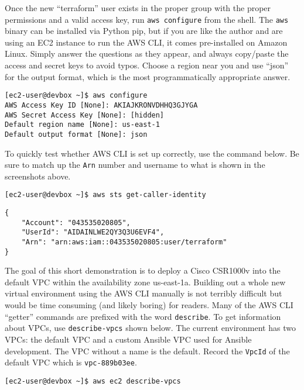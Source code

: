 Once the new ``terraform'' user exists in the proper group with the proper
permissions and a valid access key, run \verb|aws configure| from the shell. The
\verb|aws| binary can be installed via Python pip, but if you are like the author
and are using an EC2 instance to run the AWS CLI, it comes pre-installed on
Amazon Linux. Simply answer the questions as they appear, and always
copy/paste the access and secret keys to avoid typos. Choose a region near you
and use ``json'' for the output format, which is the most programmatically
appropriate answer.

\begin{verbatim}
[ec2-user@devbox ~]$ aws configure
AWS Access Key ID [None]: AKIAJKRONVDHHQ3GJYGA
AWS Secret Access Key [None]: [hidden]
Default region name [None]: us-east-1
Default output format [None]: json
\end{verbatim}

To quickly test whether AWS CLI is set up correctly, use the command below. Be
sure to match up the \verb|Arn| number and username to what is shown in the
screenshots above.

\begin{verbatim}
[ec2-user@devbox ~]$ aws sts get-caller-identity
\end{verbatim}

\begin{verbatim}
{
    "Account": "043535020805", 
    "UserId": "AIDAINLWE2QY3Q3U6EVF4", 
    "Arn": "arn:aws:iam::043535020805:user/terraform"
}
\end{verbatim}

The goal of this short demonstration is to deploy a Cisco CSR1000v into the
default VPC within the availability zone us-east-1a. Building out a whole new
virtual environment using the AWS CLI manually is not terribly difficult but
would be time consuming (and likely boring) for readers. Many of the AWS CLI
``getter'' commands are prefixed with the word \verb|describe|. To get information
about VPCs, use \verb|describe-vpcs| shown below. The current environment has two
VPCs: the default VPC and a custom Ansible VPC used for Ansible development.
The VPC without a name is the default. Record the \verb|VpcId| of the default VPC
which is \verb|vpc-889b03ee|.

\begin{verbatim}
[ec2-user@devbox ~]$ aws ec2 describe-vpcs
\end{verbatim}


